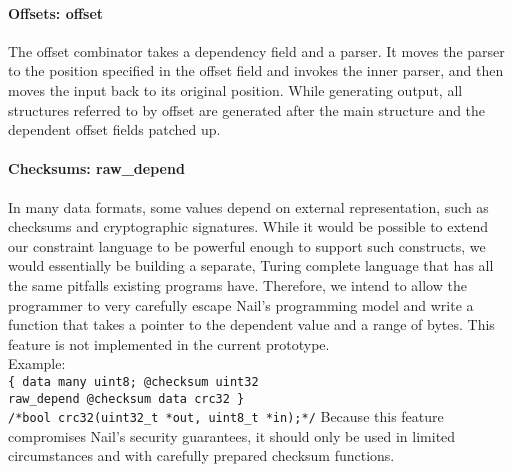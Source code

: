 \paragraph{Offsets: offset} 
The offset combinator takes a dependency field and a parser. It moves the parser
to the position specified in the offset field and invokes the inner parser, and
then moves the input back to its original position.
While generating output, all structures referred to by offset are generated
after the main structure and the dependent offset fields patched up.

\paragraph{Checksums: raw_depend}
In many data formats, some values depend on external representation, such as
checksums and cryptographic signatures. While it would be possible to extend
our constraint language to be powerful enough to support such constructs, we
would essentially be building a separate, Turing complete language that has all
the same pitfalls existing programs have. Therefore, we intend to  allow the programmer to
very carefully escape Nail's programming model and write a function that takes a
pointer to the dependent value and a range of bytes. 
This feature is not implemented in the current prototype. \\
Example:\\
 \verb+{ data many uint8; @checksum uint32+\\
 \verb+raw_depend @checksum data crc32 }+\\
 \verb+/*bool crc32(uint32_t *out, uint8_t *in);*/+
Because this feature compromises Nail's security guarantees, it should only be
used in limited circumstances and with carefully prepared checksum functions. 


